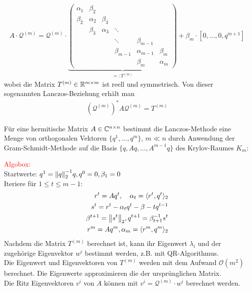 \begin{align*}A\cdot \mathcal{Q}^{(m)} = \mathcal{Q}^{(m)}\cdot\underbrace{\begin{pmatrix}
  \alpha_1 & \beta_2 & & & & \\
  \beta_2 & \alpha_2 & \beta_3 & & & \\
  & \beta_3 & \alpha_3 & \ddots & & \\
  & & & \ddots & \beta_{m-1} & \\
  & & & \beta_{m-1} & \alpha_{m-1} & \beta_m \\
  & & & & \beta_m & \alpha_m
\end{pmatrix}}_{=:T^{(m)}} + \beta_m\cdot[0,\dots,0,q^{m+1}]\end{align*}
wobei die Matrix $T^{(m)}\in\mathbb R^{m\times m}$ ist reell und symmetrisch. Von dieser sogenannten Lanczos-Beziehung
erhält man 
\begin{align*}(\mathcal{Q}^{(m)})^* A \mathcal{Q}^{(m)} = T^{(m)}\end{align*} 
\begin{defbox}
  Für eine hermitische Matrix $A\in\mathbb C  ^{n\times n}$ bestimmt die Lanczos-Methode eine Menge von orthogonalen 
  Vektoren $\{q^1,\dots,q^m\}$, $m\ll n$ durch Anwendung der Gram-Schmidt-Methode auf die Basis 
  $\{q,Aq,\dots,A^{m-1}q\}$ des Krylov-Raumes $K_m$:
\end{defbox}
\textcolor{red}{Algobox:} \\
Startwerte: $q^1=\vertn{2}{q}_2^{-1}q, q^0=0, \beta_1=0$ \\
Iteriere für $1\leq t\leq m-1$:
\begin{align*}
  r^t = Aq^t, \quad \alpha_t = \langle r^t, q^t\rangle_2 \\
  s^t = r^t - \alpha_t q^t - \beta-tq^{t-1} \\
  \beta^{t+1} = \vertn{2}{s^t}_2, q^{t+1} = \beta_{t+1}^{-1}s^t \\
  r^m = Aq^m, \alpha_m = \langle r^m,q^m\rangle_2
\end{align*}
Nachdem die Matrix $T^{(m)}$ berechnet ist, kann ihr Eigenwert $\lambda_i$ und der zugehörige Eigenvektor $w^{i}$
bestimmt werden, z.B. mit QR-Algorithmus. \\
Die Eigenwert und Eigenvektoren von $T^{(m)}$ werden mit dem Aufwand $\mathcal{O}(m^2)$ berechnet. Die Eigenwerte 
approximieren die der ursprünglichen Matrix. \\
Die Ritz Eigenvektoren $v^i$ von $A$ können mit $v^i=\mathcal{Q}^{(m)}\cdot w^i$ berechnet werden.

